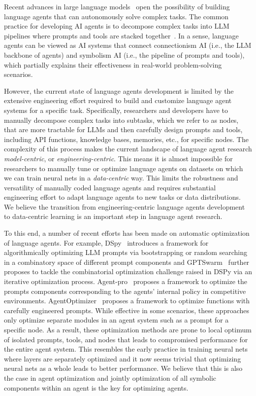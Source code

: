 \documentclass{article}
\begin{document}
Recent advances in large language models~\citep{gpt,gpt2,gpt3,gpt3.5,gpt4,llama,llama2} open the possibility of building language agents that can autonomously solve complex tasks. The common practice for developing AI agents is to decompose complex tasks into LLM pipelines where prompts and tools are stacked together~\citep{park2023generative,hong2023metagpt,zhou2023agents,chen2023agentverse,OpenAgents}. In a sense, language agents can be viewed as AI systems that connect connectionism AI (i.e., the LLM backbone of agents) and symbolism AI (i.e., the pipeline of prompts and tools), which partially explains their effectiveness in real-world problem-solving scenarios.

However, the current state of language agents development is limited by the extensive engineering effort required to build and customize language agent systems for a specific task. Specifically, researchers and developers have to manually decompose complex tasks into subtasks, which we refer to as nodes, that are more tractable for LLMs and then carefully design prompts and tools, including API functions, knowledge bases, memories, etc., for specific nodes. The complexity of this process makes the current landscape of language agent research \textit{model-centric}, or \textit{engineering-centric}. This means it is almost impossible for researchers to manually tune or optimize language agents on datasets on which we can train neural nets in a \textit{data-centric} way. This limits the robustness and versatility of manually coded language agents and requires substantial engineering effort to adapt language agents to new tasks or data distributions. We believe the transition from engineering-centric language agents development to data-centric learning is an important step in language agent research.

To this end, a number of recent efforts has been made on automatic optimization of language agents. For example, DSpy~\citep{khattab2023dspy} introduces a framework for algorithmically optimizing LLM prompts via bootstrapping or random searching in a combinatory space of different prompt components and GPTSwarm~\citep{zhuge2024language} further proposes to tackle the combinatorial optimization challenge raised in DSPy via an iterative optimization process. Agent-pro~\citep{zhang2024agentpro} proposes a framework to optimize the prompts components corresponding to the agents' internal policy in competitive environments. AgentOptimizer~\citep{zhang2024offline} proposes a framework to optimize functions with carefully engineered prompts. While effective in some scenarios, these approaches only optimize separate modules in an agent system such as a prompt for a specific node. As a result, these optimization methods are prone to local optimum of isolated prompts, tools, and nodes that leads to compromised performance for the entire agent system. This resembles the early practice in training neural nets~\citep{hinton2006reducing} where layers are separately optimized and it now seems trivial that optimizing neural nets as a whole leads to better performance. We believe that this is also the case in agent optimization and jointly optimization of all symbolic components within an agent is the key for optimizing agents. 
\end{document}
